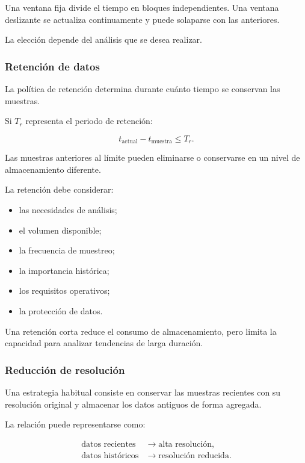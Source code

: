 Una ventana fija divide el tiempo en bloques independientes. Una ventana
deslizante se actualiza continuamente y puede solaparse con las
anteriores.

La elección depende del análisis que se desea realizar.


\subsubsection*{Retención de datos}

La política de retención determina durante cuánto tiempo se conservan las
muestras.

Si \(T_r\) representa el periodo de retención:

\[
    t_{\mathrm{actual}}
    -
    t_{\mathrm{muestra}}
    \leq
    T_r.
\]

Las muestras anteriores al límite pueden eliminarse o conservarse en un
nivel de almacenamiento diferente.

La retención debe considerar:

\begin{itemize}
    \item las necesidades de análisis;

    \item el volumen disponible;

    \item la frecuencia de muestreo;

    \item la importancia histórica;

    \item los requisitos operativos;

    \item la protección de datos.
\end{itemize}

Una retención corta reduce el consumo de almacenamiento, pero limita la
capacidad para analizar tendencias de larga duración.


\subsubsection*{Reducción de resolución}

Una estrategia habitual consiste en conservar las muestras recientes con
su resolución original y almacenar los datos antiguos de forma agregada.

La relación puede representarse como:

\[
\begin{aligned}
    \text{datos recientes}
    &\longrightarrow
    \text{alta resolución},\\
    \text{datos históricos}
    &\longrightarrow
    \text{resolución reducida}.
\end{aligned}
\]

